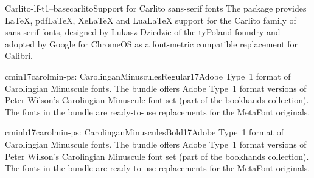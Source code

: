 \documentclass{ddltxtyp}
\begin{document}


\begin{package}{Carlito-lf-t1--base}{carlito}{Support for Carlito sans-serif fonts}
The package provides LaTeX, pdfLaTeX, XeLaTeX and LuaLaTeX
support for the Carlito family of sans serif fonts, designed by
Lukasz Dziedzic of the tyPoland foundry and adopted by Google
for ChromeOS as a font-metric compatible replacement for
Calibri.
\end{package}

\begin{package}{cmin17}{carolmin-ps: CarolinganMinusculesRegular17}{Adobe Type~1 format of Carolingian Minuscule fonts.}
The bundle offers Adobe Type~1 format versions of Peter
Wilson's Carolingian Minuscule font set (part of the bookhands
collection). The fonts in the bundle are ready-to-use
replacements for the MetaFont originals.
\end{package}
\begin{package}{cminb17}{carolmin-ps: CarolinganMinusculesBold17}{Adobe Type~1 format of Carolingian Minuscule fonts.}
The bundle offers Adobe Type~1 format versions of Peter
Wilson's Carolingian Minuscule font set (part of the bookhands
collection). The fonts in the bundle are ready-to-use
replacements for the MetaFont originals.
\end{package}

\end{document}
